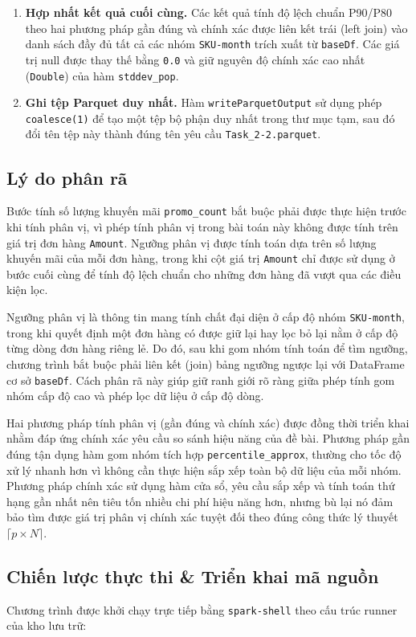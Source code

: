 \begin{enumerate}
    \item \textbf{Hợp nhất kết quả cuối cùng.} Các kết quả tính độ lệch chuẩn P90/P80 theo hai phương pháp gần đúng và chính xác được liên kết trái (left join) vào danh sách đầy đủ tất cả các nhóm \texttt{SKU-month} trích xuất từ \texttt{baseDf}. Các giá trị null được thay thế bằng \texttt{0.0} và giữ nguyên độ chính xác cao nhất (\texttt{Double}) của hàm \texttt{stddev\_pop}.
    \item \textbf{Ghi tệp Parquet duy nhất.} Hàm \texttt{writeParquetOutput} sử dụng phép \texttt{coalesce(1)} để tạo một tệp bộ phận duy nhất trong thư mục tạm, sau đó đổi tên tệp này thành đúng tên yêu cầu \texttt{Task\_2-2.parquet}.
\end{enumerate}

\subsection{Lý do phân rã}
Bước tính số lượng khuyến mãi \texttt{promo\_count} bắt buộc phải được thực hiện trước khi tính phân vị, vì phép tính phân vị trong bài toán này không được tính trên giá trị đơn hàng \texttt{Amount}. Ngưỡng phân vị được tính toán dựa trên số lượng khuyến mãi của mỗi đơn hàng, trong khi cột giá trị \texttt{Amount} chỉ được sử dụng ở bước cuối cùng để tính độ lệch chuẩn cho những đơn hàng đã vượt qua các điều kiện lọc.

Ngưỡng phân vị là thông tin mang tính chất đại diện ở cấp độ nhóm \texttt{SKU-month}, trong khi quyết định một đơn hàng có được giữ lại hay lọc bỏ lại nằm ở cấp độ từng dòng đơn hàng riêng lẻ. Do đó, sau khi gom nhóm tính toán để tìm ngưỡng, chương trình bắt buộc phải liên kết (join) bảng ngưỡng ngược lại với DataFrame cơ sở \texttt{baseDf}. Cách phân rã này giúp giữ ranh giới rõ ràng giữa phép tính gom nhóm cấp độ cao và phép lọc dữ liệu ở cấp độ dòng.

Hai phương pháp tính phân vị (gần đúng và chính xác) được đồng thời triển khai nhằm đáp ứng chính xác yêu cầu so sánh hiệu năng của đề bài. Phương pháp gần đúng tận dụng hàm gom nhóm tích hợp \texttt{percentile\_approx}, thường cho tốc độ xử lý nhanh hơn vì không cần thực hiện sắp xếp toàn bộ dữ liệu của mỗi nhóm. Phương pháp chính xác sử dụng hàm cửa sổ, yêu cầu sắp xếp và tính toán thứ hạng gần nhất nên tiêu tốn nhiều chi phí hiệu năng hơn, nhưng bù lại nó đảm bảo tìm được giá trị phân vị chính xác tuyệt đối theo đúng công thức lý thuyết $\lceil p \times N \rceil$.

\subsection{Chiến lược thực thi \& Triển khai mã nguồn}
Chương trình được khởi chạy trực tiếp bằng \texttt{spark-shell} theo cấu trúc runner của kho lưu trữ:

